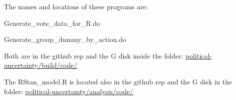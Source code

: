 \documentclass[a4paper,12pt]{article}
\begin{document}
\begin{enumerate}
The names and locations of these programs are:

Generate\_vote\_data\_for\_R.do

Generate\_group\_dummy\_by\_action.do

Both are in the github rep and the G disk inside the folder:
\url{political-uncertainty/build/code/}

The RStan\_model.R is located also in the github rep and the G disk in the folder:
\url{political-uncertainty/analysis/code/}




\end{enumerate}
\end{document}
